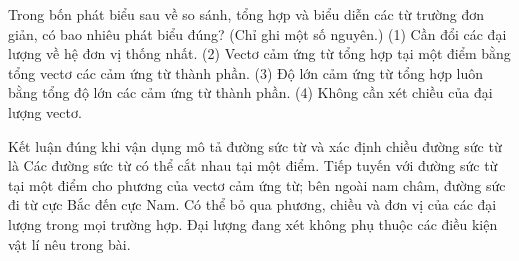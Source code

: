 \begin{ex}
Trong bốn phát biểu sau về so sánh, tổng hợp và biểu diễn các từ trường đơn giản, có bao nhiêu phát biểu đúng? (Chỉ ghi một số nguyên.) (1) Cần đổi các đại lượng về hệ đơn vị thống nhất. (2) Vectơ cảm ứng từ tổng hợp tại một điểm bằng tổng vectơ các cảm ứng từ thành phần. (3) Độ lớn cảm ứng từ tổng hợp luôn bằng tổng độ lớn các cảm ứng từ thành phần. (4) Không cần xét chiều của đại lượng vectơ.
\end{ex}

\begin{ex}
Kết luận đúng khi vận dụng mô tả đường sức từ và xác định chiều đường sức từ là
\choice
{Các đường sức từ có thể cắt nhau tại một điểm.}
{\True Tiếp tuyến với đường sức từ tại một điểm cho phương của vectơ cảm ứng từ; bên ngoài nam châm, đường sức đi từ cực Bắc đến cực Nam.}
{Có thể bỏ qua phương, chiều và đơn vị của các đại lượng trong mọi trường hợp.}
{Đại lượng đang xét không phụ thuộc các điều kiện vật lí nêu trong bài.}
\end{ex}

